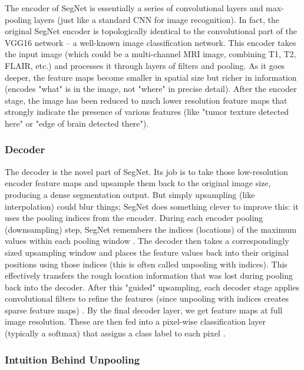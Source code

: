 The encoder of SegNet is essentially a series of convolutional layers and max-pooling layers (just like a standard CNN for image recognition). In fact, the original SegNet encoder is topologically identical to the convolutional part of the VGG16 network \cite{paperswithcode2023segnet} – a well-known image classification network. This encoder takes the input image (which could be a multi-channel MRI image, combining T1, T2, FLAIR, etc.) and processes it through layers of filters and pooling. As it goes deeper, the feature maps become smaller in spatial size but richer in information (encodes "what" is in the image, not "where" in precise detail). After the encoder stage, the image has been reduced to much lower resolution feature maps that strongly indicate the presence of various features (like "tumor texture detected here" or "edge of brain detected there").

\subsubsection{Decoder}
\label{sec:segnet_decoder}

The decoder is the novel part of SegNet. Its job is to take those low-resolution encoder feature maps and upsample them back to the original image size, producing a dense segmentation output. But simply upsampling (like interpolation) could blur things; SegNet does something clever to improve this: it uses the pooling indices from the encoder. During each encoder pooling (downsampling) step, SegNet remembers the indices (locations) of the maximum values within each pooling window \cite{paperswithcode2023segnet}. The decoder then takes a correspondingly sized upsampling window and places the feature values back into their original positions using those indices (this is often called unpooling with indices). This effectively transfers the rough location information that was lost during pooling back into the decoder. After this "guided" upsampling, each decoder stage applies convolutional filters to refine the features (since unpooling with indices creates sparse feature maps) \cite{fezan2023segmentation}. By the final decoder layer, we get feature maps at full image resolution. These are then fed into a pixel-wise classification layer (typically a softmax) that assigns a class label to each pixel \cite{fezan2023segmentation}.

\subsubsection{Intuition Behind Unpooling}
\label{sec:unpooling_intuition}

